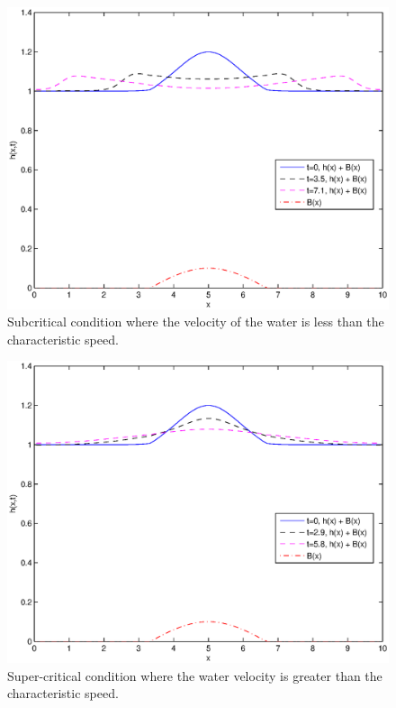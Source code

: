 \begin{figure}
	[htbp] \centering 
	\includegraphics[width=\MyWidth]{Figures/critical_c2817_p1_n_is_80_a_0.eps} \caption{Subcritical condition where the velocity of the water is less than the characteristic speed.} \label{fig:Figures_critical_c2817_p1_n_is_80_a_0} 
\end{figure}

\begin{figure}
	[htbp] \centering 
	\includegraphics[width=\MyWidth]{Figures/critical_c3444_p1_n_is_80_a_0.eps} \caption{Super-critical condition where the water velocity is greater than the characteristic speed.} \label{fig:Figures_critical_c3444_p1_n_is_80_a_0} 
\end{figure}


